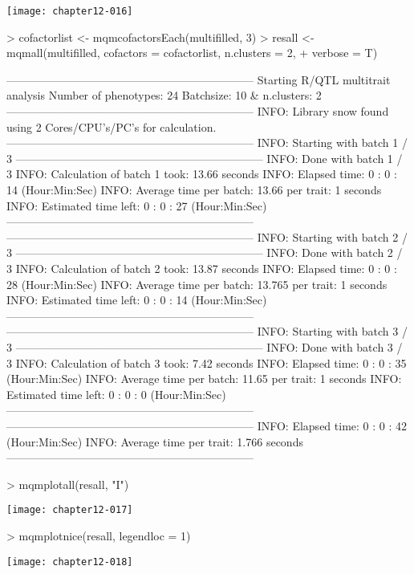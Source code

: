\documentclass[a4paper]{article}
\begin{document}
\texttt{[image: chapter12-016]}
\begin{Schunk}
\begin{Sinput}
> cofactorlist <- mqmcofactorsEach(multifilled, 3)
> resall <- mqmall(multifilled, cofactors = cofactorlist, n.clusters = 2, 
+     verbose = T)
\end{Sinput}
\begin{Soutput}
------------------------------------------------------------------
Starting R/QTL multitrait analysis
Number of phenotypes: 24 
Batchsize: 10  & n.clusters: 2 
------------------------------------------------------------------
INFO: Library snow found using  2  Cores/CPU's/PC's for calculation.
------------------------------------------------------------------
INFO: Starting with batch 1 / 3 
------------------------------------------------------------------
INFO: Done with batch 1 / 3 
INFO: Calculation of batch 1 took: 13.66 seconds
INFO: Elapsed time: 0 : 0 : 14 (Hour:Min:Sec)
INFO: Average time per batch: 13.66  per trait: 1 seconds
INFO: Estimated time left: 0 : 0 : 27 (Hour:Min:Sec)
------------------------------------------------------------------
------------------------------------------------------------------
INFO: Starting with batch 2 / 3 
------------------------------------------------------------------
INFO: Done with batch 2 / 3 
INFO: Calculation of batch 2 took: 13.87 seconds
INFO: Elapsed time: 0 : 0 : 28 (Hour:Min:Sec)
INFO: Average time per batch: 13.765  per trait: 1 seconds
INFO: Estimated time left: 0 : 0 : 14 (Hour:Min:Sec)
------------------------------------------------------------------
------------------------------------------------------------------
INFO: Starting with batch 3 / 3 
------------------------------------------------------------------
INFO: Done with batch 3 / 3 
INFO: Calculation of batch 3 took: 7.42 seconds
INFO: Elapsed time: 0 : 0 : 35 (Hour:Min:Sec)
INFO: Average time per batch: 11.65  per trait: 1 seconds
INFO: Estimated time left: 0 : 0 : 0 (Hour:Min:Sec)
------------------------------------------------------------------
------------------------------------------------------------------
INFO: Elapsed time: 0 : 0 : 42 (Hour:Min:Sec)
INFO: Average time per trait: 1.766 seconds
------------------------------------------------------------------
\end{Soutput}
\begin{Sinput}
> mqmplotall(resall, "I")
\end{Sinput}
\end{Schunk}
\texttt{[image: chapter12-017]}
\begin{Schunk}
\begin{Sinput}
> mqmplotnice(resall, legendloc = 1)
\end{Sinput}
\end{Schunk}
\texttt{[image: chapter12-018]}
\end{document}
